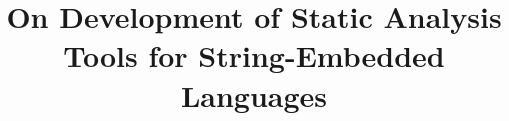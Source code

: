 \documentclass{sig-alternate-05-2015}
\begin{document}
%

\title{On Development of Static Analysis Tools for String-Embedded Languages}
%
%
%
%
%
\end{document}
